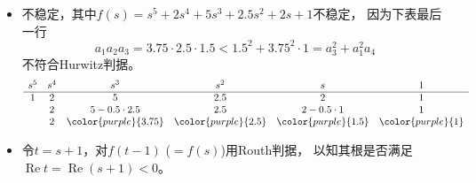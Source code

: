 \begin{itemize}
    \item[27.] 不稳定，其中$f(s)=s^5+2s^4+5s^3+2.5s^2+2s+1$不稳定，
    因为下表最后一行
    \[a_1a_2a_3=3.75\cdot2.5\cdot1.5
    <1.5^2+3.75^2\cdot1=a_3^2+a_1^2a_4\]
    不符合Hurwitz判据。
    \[\begin{array}{cccccc}
        s^5 & s^4 & s^3 & s^2 & s & 1\\
        \hline
        1 & 2 & 5 & 2.5 & 2 & 1\\
          & 2 & 5-0.5\cdot2.5 & 2.5 & 2-0.5\cdot1 & 1\\
          & 2 & \color{purple}{3.75} & \color{purple}{2.5} & \color{purple}{1.5} & \color{purple}{1}
    \end{array}\]

    \item[29.] 令$t=s+1$，对$f(t-1)$ ($=f(s)$)用Routh判据，
    以知其根是否满足$\operatorname{Re}t=\operatorname{Re}(s+1)<0$。
\end{itemize}

